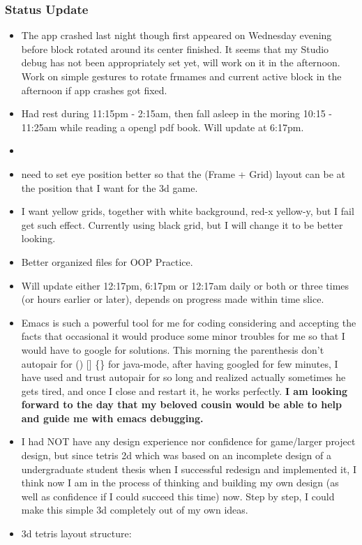 \documentclass[9pt,b5paper]{article}
\begin{document}
\subsubsection{Status Update}
\label{sec-1-1-2}
\begin{itemize}
\item The app crashed last night though first appeared on Wednesday evening before block rotated around its center finished. It seems that my Studio debug has not been appropriately set yet, will work on it in the afternoon. Work on simple gestures to rotate frmames and current active block in the afternoon if app crashes got fixed.
\item Had rest during 11:15pm - 2:15am, then fall asleep in the moring 10:15 - 11:25am while reading a opengl pdf book. Will update at 6:17pm.
\item 
\item need to set eye position better so that the (Frame + Grid) layout can be at the position that I want for the 3d game.
\item I want yellow grids, together with white background, red-x yellow-y, but I fail get such effect. Currently using black grid, but I will change it to be better looking.
\item Better organized files for OOP Practice.
\item Will update either 12:17pm, 6:17pm or 12:17am daily or both or three times (or hours earlier or later), depends on progress made within time slice.
\item Emacs is such a powerful tool for me for coding considering and accepting the facts that occasional it would produce some minor troubles for me so that I would have to google for solutions. This morning the parenthesis don't autopair for () [] \{\} for java-mode, after having googled for few minutes, I have used and trust autopair for so long and realized actually sometimes he gets tired, and once I close and restart it, he works perfectly. \textbf{I am looking forward to the day that my beloved cousin would be able to help and guide me with emacs debugging.}
\item I had NOT have any design experience nor confidence for game/larger project design, but since tetris 2d which was based on an incomplete design of a undergraduate student thesis when I successful redesign and implemented it, I think now I am in the process of thinking and building my own design (as well as confidence if I could succeed this time) now. Step by step, I could make this simple 3d completely out of my own ideas.
\item 3d tetris layout structure: 


\end{itemize}
\end{document}
